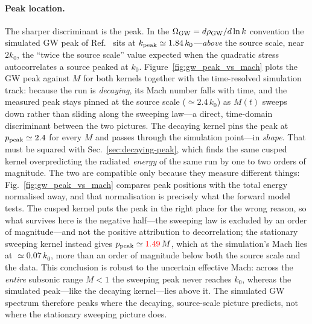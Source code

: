 \documentclass[10pt,prd,aps,nobibnotes,superscriptaddress,preprintnumbers,notitlepage]{revtex4-1}
\newcommand{\add}[1]{{\color{red}#1}}
\newcommand{\add}[1]{#1}
\begin{document}
\paragraph{Peak location.} The sharper discriminant is the peak. In the
$\Omega_{\rm GW}=d\rho_{\rm GW}/d\ln k$ convention the simulated GW peak of
Ref.~\cite{RoperPol:2019wvy} sits at $k_{\rm peak}\simeq1.84\,k_0$---\emph{above} the source scale, near $2k_0$, the ``twice
the source scale'' value expected when the quadratic stress autocorrelates a source
peaked at $k_0$. Figure~\ref{fig:gw_peak_vs_mach} plots the GW peak against $M$ for both
kernels together with the time-resolved simulation track: because the run is
\emph{decaying}, its Mach number falls with time, and the measured peak stays
pinned at the source scale ($\simeq2.4\,k_0$) as $M(t)$ sweeps down rather than
sliding along the sweeping law---a direct, time-domain discriminant between the
two pictures. The decaying kernel pins the peak at
$p_{\rm peak}\simeq2.4$ for every $M$ and passes through the simulation point\add{---in
\emph{shape}. That must be squared with Sec.~\ref{sec:decaying-peak}, which finds the same
cusped kernel overpredicting the radiated \emph{energy} of the same run by one to two
orders of magnitude. The two are compatible only because they measure different things:
Fig.~\ref{fig:gw_peak_vs_mach} compares peak positions with the total energy normalised
away, and that normalisation is precisely what the forward model tests. The cusped kernel
puts the peak in the right place for the wrong reason, so what survives here is the
negative half---the sweeping law is excluded by an order of magnitude---and not the
positive attribution to decorrelation}; the
stationary sweeping kernel instead gives $p_{\rm peak}\simeq\add{1.49}\,M$, which at the
simulation's Mach lies at $\simeq0.07\,k_0$, more than an order of magnitude below both
the source scale and the data. This conclusion is robust to the uncertain effective
Mach: across the \emph{entire} subsonic range $M<1$ the sweeping peak never reaches
$k_0$, whereas the simulated peak---like the decaying kernel---lies above it. The
simulated GW spectrum therefore peaks where the decaying, source-scale picture predicts,
not where the stationary sweeping picture does.
\end{document}
